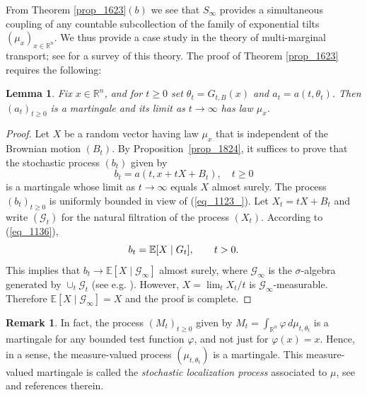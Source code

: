\documentclass[12pt,a4paper]{article}
\newcommand{\E}{\mathbb{E}}
\newcommand{\RR}{\mathbb{R}}
\newcommand{\R}{\mathbb{R}}
\renewcommand{\phi}{\varphi}
\newtheorem{lemma}[theorem]{Lemma}
\theoremstyle{definition}
\newtheorem{remark}[theorem]{Remark}
\newcommand{\cG}{\mathcal{G}}
\begin{document}
From Theorem  \ref{prop_1623}$(b)$ we see  that $S_{\infty}$ provides a simultaneous coupling of any countable subcollection of the family of exponential tilts $(\mu_x)_{x \in \RR^n}$.
We thus provide a case study
in the theory of  multi-marginal transport;  see \cite{pass} for a survey of this theory.
The proof of Theorem \ref{prop_1623} requires the following:
%
\begin{lemma} \label{lem_9999}
Fix $x\in \R^n$, and for $t \geq 0$ set $\theta_t = G_{t,B}(x)$ and $a_t = a(t,\theta_t)$. Then $(a_t)_{t \geq 0}$ is a martingale
and its limit as $t \to \infty$ has law $\mu_x$.
\end{lemma}
%
\begin{proof}
Let $X$ be a random vector having law $\mu_x$ that
is independent of the Brownian motion $(B_t)$.
By Proposition~\ref{prop_1824},
it suffices to prove that the stochastic process $(b_t)$ given by
\[
b_{t} = a (t , x + t X + B_t )  , \quad t\geq 0
\]
is a martingale whose limit as $t \to \infty$ 
equals $X$ almost surely. The  process $(b_t)_{t \geq 0}$ is uniformly bounded in view of 
(\ref{eq_1123_}). Let $X_t = t X + B_t$ and write $(\cG_t)$ for 
the natural filtration of
the process $(X_t)$. 
According to (\ref{eq_1136}),
\[
b_t = \E [ X\mid \mathcal \cG_t ] , \qquad t>0.
\]
This implies that $b_t \to \E [X\mid \mathcal G_\infty]$
almost surely, where $\mathcal G_\infty$
is the $\sigma$-algebra generated by $\cup_t \mathcal G_t$
(see e.g. \cite[Chapter 14]{will}).
However, $X = \lim_t X_t/t$ is $\mathcal G_\infty$-measurable.
Therefore $\E [ X \mid \mathcal G_\infty ] = X$ and the proof is complete. 
\end{proof}
%
\begin{remark}
In fact, the process $(M_t)_{t \geq 0}$ given by
$M_t = \int_{\R^n}  \phi \, d\mu_{t,\theta_t}$ is a martingale
for any bounded test function $\phi$, and not just for $\phi (x) = x$.
Hence, in a sense, the measure-valued
process $(\mu_{t,\theta_t})$ is a martingale.
This measure-valued martingale is called the \emph{stochastic localization process} associated
to $\mu$, see \cite{KLbull} and references therein.
\end{remark}
%
\end{document}
